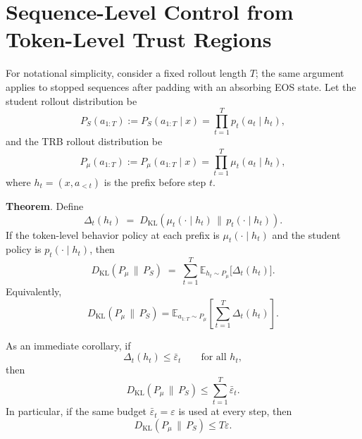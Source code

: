 \documentclass{llmxive}
\providecommand{\paragraph}[1]{\vspace{1mm}\noindent\textbf{#1}.}
\begin{document}
\section{Sequence-Level Control from Token-Level Trust Regions}
\label{app:sequence_kl}

For notational simplicity, consider a fixed rollout length $T$; the same argument applies to stopped sequences after padding with an absorbing EOS state.
Let the student rollout distribution be
\begin{equation*}
P_S(a_{1:T})
:=
P_S(a_{1:T}\mid x)
=
\prod_{t=1}^T p_t(a_t\mid h_t),
\end{equation*}
and the TRB rollout distribution be
\begin{equation*}
P_{\mu}(a_{1:T})
:=
P_{\mu}(a_{1:T}\mid x)
=
\prod_{t=1}^T \mu_t(a_t\mid h_t),
\end{equation*}
where $h_t=(x,a_{<t})$ is the prefix before step $t$.

\paragraph{Theorem}
Define
\[
\Delta_t(h_t)
\;=\;
D_{\mathrm{KL}}(\mu_t(\cdot\mid h_t)\,\|\,p_t(\cdot\mid h_t)).
\]
If the token-level behavior policy at each prefix is $\mu_t(\cdot\mid h_t)$ and the student policy is $p_t(\cdot\mid h_t)$, then
\begin{equation}
\label{eq:rollout-kl-decomposition}
D_{\mathrm{KL}}(P_{\mu}\,\|\,P_S)
\;=\;
\sum_{t=1}^T
\mathbb{E}_{h_t\sim P_{\mu}}
\bigl[\Delta_t(h_t)\bigr].
\end{equation}
Equivalently,
\[
D_{\mathrm{KL}}(P_{\mu}\,\|\,P_S)
=
\mathbb{E}_{a_{1:T}\sim P_{\mu}}
\left[
\sum_{t=1}^T \Delta_t(h_t)
\right].
\]

As an immediate corollary, if
\[
\Delta_t(h_t)\le \bar\varepsilon_t
\qquad\text{for all } h_t,
\]
then
\begin{equation}
D_{\mathrm{KL}}(P_{\mu}\,\|\,P_S)
\le
\sum_{t=1}^T \bar\varepsilon_t.
\end{equation}
In particular, if the same budget $\bar\varepsilon_t=\varepsilon$ is used at every step, then
\begin{equation}
D_{\mathrm{KL}}(P_{\mu}\,\|\,P_S)
\le
T\varepsilon.
\end{equation}
\end{document}
